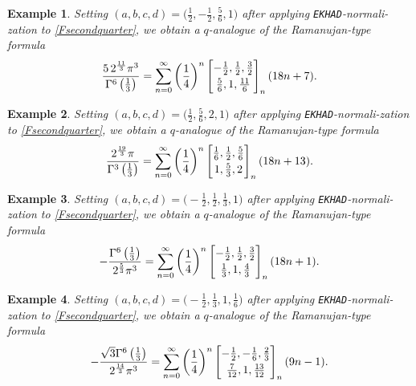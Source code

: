 \documentclass[12pt]{article}
\newtheorem{example}{Example}
\begin{document}
\begin{example}
 Setting $(a, b, c, d) = \big( \frac{1}{2}, -\frac{1}{2}, \frac{5}{6}, 1 \big)$ 
 after applying {\tt EKHAD}-normali-zation to \eqref{Fsecondquarter}, 
 we obtain a $q$-analogue of the Ramanujan-type formula 
 $$ \frac{ 5 \, 2^{\frac{11}{3}} \pi^3 }{ \Gamma^{6}\left( \frac{1}{3} 
 \right) } = \sum_{n = 0}^{\infty} 
 \left( \frac{1}{4} \right)^{n} \left[ \begin{matrix} 
 -\frac{1}{2}, \frac{1}{2}, \frac{3}{2} \vspace{1mm} \\ 
 \frac{5}{6}, 1, \frac{11}{6} \end{matrix} \right]_{n} (18n+7). $$
\end{example} 

\begin{example}
 Setting $(a, b, c, d) = \big( \frac{1}{2}, \frac{5}{6}, 2, 1 \big)$ 
 after applying {\tt EKHAD}-normali-zation to \eqref{Fsecondquarter}, 
 we obtain a $q$-analogue of the Ramanujan-type formula 
 $$ \frac{ 2^{\frac{19}{3}} \pi }{ \Gamma^{3}\left( \frac{1}{3} 
 \right) } = \sum_{n = 0}^{\infty} 
 \left( \frac{1}{4} \right)^{n} \left[ \begin{matrix} 
 \frac{1}{6}, \frac{1}{2}, \frac{5}{6} \vspace{1mm} \\ 
 1, \frac{5}{3}, 2 \end{matrix} \right]_{n} (18n+13). $$
\end{example} 

\begin{example}
 Setting $(a, b, c, d) = \big( -\frac{1}{2}, \frac{1}{2}, \frac{1}{3}, 1 \big)$ 
 after applying {\tt EKHAD}-normali-zation to \eqref{Fsecondquarter}, 
 we obtain a $q$-analogue of the Ramanujan-type formula 
 $$ -\frac{\Gamma^{6}\left( \frac{1}{3} \right)}{2^{\frac{5}{3}} \pi^3} = \sum_{n = 0}^{\infty} 
 \left( \frac{1}{4} \right)^{n} \left[ \begin{matrix} 
 -\frac{1}{2}, \frac{1}{2}, \frac{3}{2} \vspace{1mm} \\ 
 \frac{1}{3}, 1, \frac{4}{3} \end{matrix} \right]_{n} (18n + 1). $$
\end{example} 

\begin{example}
 Setting $(a, b, c, d) = \big( -\frac{1}{2}, \frac{1}{3}, 1, \frac{1}{6} \big)$ 
 after applying {\tt EKHAD}-normali-zation to \eqref{Fsecondquarter}, 
 we obtain a $q$-analogue of the Ramanujan-type formula 
 $$ -\frac{ \sqrt{3} \Gamma^{6}\left( \frac{1}{3} \right) }{2^{\frac{14}{3}} \pi^3} = 
 \sum_{n = 0}^{\infty} 
 \left( \frac{1}{4} \right)^{n} \left[ \begin{matrix} 
 -\frac{1}{2}, -\frac{1}{6}, \frac{2}{3} \vspace{1mm} \\ 
 \frac{7}{12}, 1, \frac{13}{12} \end{matrix} \right]_{n} (9n - 1). $$
\end{example} 
\end{document}

